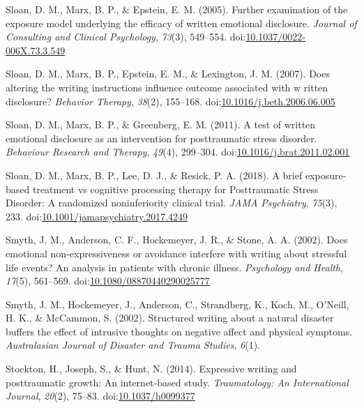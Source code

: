 \documentclass[man]{apa6}
\theoremstyle{definition}
\theoremstyle{definition}
\theoremstyle{definition}
\theoremstyle{remark}
\begin{document}
\leavevmode\hypertarget{ref-Sloan2005}{}%
Sloan, D. M., Marx, B. P., \& Epstein, E. M. (2005). Further examination
of the exposure model underlying the efficacy of written emotional
disclosure. \emph{Journal of Consulting and Clinical Psychology},
\emph{73}(3), 549--554.
doi:\href{https://doi.org/10.1037/0022-006X.73.3.549}{10.1037/0022-006X.73.3.549}

\leavevmode\hypertarget{ref-Sloan2007}{}%
Sloan, D. M., Marx, B. P., Epstein, E. M., \& Lexington, J. M. (2007).
Does altering the writing instructions influence outcome associated with
w ritten disclosure? \emph{Behavior Therapy}, \emph{38}(2), 155--168.
doi:\href{https://doi.org/10.1016/j.beth.2006.06.005}{10.1016/j.beth.2006.06.005}

\leavevmode\hypertarget{ref-Sloan2011a}{}%
Sloan, D. M., Marx, B. P., \& Greenberg, E. M. (2011). A test of written
emotional disclosure as an intervention for posttraumatic stress
disorder. \emph{Behaviour Research and Therapy}, \emph{49}(4), 299--304.
doi:\href{https://doi.org/10.1016/j.brat.2011.02.001}{10.1016/j.brat.2011.02.001}

\leavevmode\hypertarget{ref-Sloan2018}{}%
Sloan, D. M., Marx, B. P., Lee, D. J., \& Resick, P. A. (2018). A brief
exposure-based treatment vs cognitive processing therapy for
Posttraumatic Stress Disorder: A randomized noninferiority clinical
trial. \emph{JAMA Psychiatry}, \emph{75}(3), 233.
doi:\href{https://doi.org/10.1001/jamapsychiatry.2017.4249}{10.1001/jamapsychiatry.2017.4249}

\leavevmode\hypertarget{ref-Smyth2002a}{}%
Smyth, J. M., Anderson, C. F., Hockemeyer, J. R., \& Stone, A. A.
(2002). Does emotional non-expressiveness or avoidance interfere with
writing about stressful life events? An analysis in patients with
chronic illness. \emph{Psychology and Health}, \emph{17}(5), 561--569.
doi:\href{https://doi.org/10.1080/08870440290025777}{10.1080/08870440290025777}

\leavevmode\hypertarget{ref-Smyth2002}{}%
Smyth, J. M., Hockemeyer, J., Anderson, C., Strandberg, K., Koch, M.,
O'Neill, H. K., \& McCammon, S. (2002). Structured writing about a
natural disaster buffers the effect of intrusive thoughts on negative
affect and physical symptoms. \emph{Australasian Journal of Disaster and
Trauma Studies}, \emph{6}(1).

\leavevmode\hypertarget{ref-Stockton2014}{}%
Stockton, H., Joseph, S., \& Hunt, N. (2014). Expressive writing and
posttraumatic growth: An internet-based study. \emph{Traumatology: An
International Journal}, \emph{20}(2), 75--83.
doi:\href{https://doi.org/10.1037/h0099377}{10.1037/h0099377}
\end{document}
